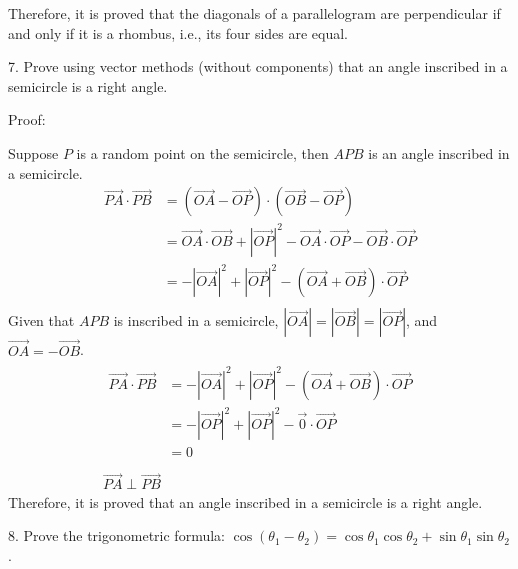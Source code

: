 \documentclass{article}
\begin{document}
Therefore, it is proved that the diagonals of a parallelogram are perpendicular 
if and only if it is a rhombus, i.e., its four sides are equal.

7. Prove using vector methods (without components) that an angle inscribed in
a semicircle is a right angle.

Proof:


Suppose $P$ is a random point on the semicircle, then $APB$ is an angle 
inscribed in a semicircle.
\begin{equation*}
\begin{split}
  \vec{PA} \cdot \vec{PB} &= (\vec{OA} - \vec{OP}) \cdot (\vec{OB} - \vec{OP}) \\
                          &= \vec{OA} \cdot \vec{OB} + |\vec{OP}|^2 - \vec{OA} \cdot \vec{OP} - \vec{OB} \cdot \vec{OP} \\
                          &= -|\vec{OA}|^2 + |\vec{OP}|^2 - (\vec{OA} + \vec{OB}) \cdot \vec{OP} \\
\end{split}
\end{equation*}
Given that $APB$ is inscribed in a semicircle, 
$|\vec{OA}| = |\vec{OB}| = |\vec{OP}|$, and $\vec{OA} = -\vec{OB}$.
\begin{gather*}
  \begin{split}
    \vec{PA} \cdot \vec{PB} &= -|\vec{OA}|^2 + |\vec{OP}|^2 - (\vec{OA} + \vec{OB}) \cdot \vec{OP} \\ 
                            &= -|\vec{OP}|^2 + |\vec{OP}|^2 - \vec{0} \cdot \vec{OP} \\
                            &= 0 \\
  \end{split} \\
  \vec{PA} \perp \vec{PB}
\end{gather*}
Therefore, it is proved that an angle inscribed in a semicircle is a right 
angle.

8. Prove the trigonometric formula: 
$\cos(\theta_1 - \theta_2) = \cos\theta_1\cos\theta_2 + \sin\theta_1\sin\theta_2$.
\end{document}
